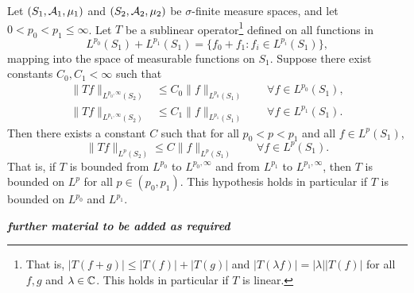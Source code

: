 \begin{thm}[Marcinkiewicz]\label{thm:marcinkiewicz}
  Let $(S_1,\mathcal{A}_1,\mu_1)$ and $(S_2,\mathcal{A}_2,\mu_2)$ be $\sigma$-finite measure spaces, and let $0 < p_0 < p_1 \leq \infty$.
  Let $T$ be a sublinear operator\footnote{That is, $|T(f + g)| \leq |T(f)| + |T(g)|$ and $|T(\lambda f)| = |\lambda||T(f)|$ for all $f,g$ and $\lambda \in \mathbb{C}$. This holds in particular if $T$ is linear.} defined on all functions in
  \begin{equation*}
    L^{p_0}(S_1) + L^{p_1}(S_1) = \{f_0 + f_1 : f_i \in L^{p_i}(S_1)\},
  \end{equation*}
  mapping into the space of measurable functions on $S_1$.
  Suppose there exist constants $C_0, C_1 < \infty$ such that
  \begin{equation*}
    \begin{aligned}
      \|Tf\|_{L^{p_0,\infty}(S_2)} &\leq C_0 \|f\|_{L^{p_0}(S_1)} \qquad \forall f \in L^{p_0}(S_1), \\
      \|Tf\|_{L^{p_1,\infty}(S_2)} &\leq C_1 \|f\|_{L^{p_1}(S_1)} \qquad \forall f \in L^{p_1}(S_1).
    \end{aligned}
  \end{equation*}
  Then there exists a constant $C$ such that for all $p_0 < p < p_1$ and all $f \in L^p(S_1)$,
  \begin{equation*}
    \|Tf\|_{L^{p}(S_2)} \leq C \|f\|_{L^{p}(S_1)} \qquad \forall f \in L^{p}(S_1).
  \end{equation*}
  That is, if $T$ is bounded from $L^{p_0}$ to $L^{p_0,\infty}$ and from $L^{p_1}$ to $L^{p_1,\infty}$, then $T$ is bounded on $L^p$ for all $p \in (p_0,p_1)$.
  This hypothesis holds in particular if $T$ is bounded on $L^{p_0}$ and $L^{p_1}$.
\end{thm}




\emph{\textbf{further material to be added as required}}







